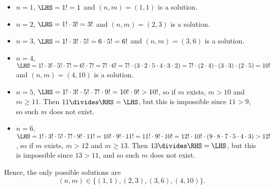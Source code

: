 \begin{enumerate}
          \begin{itemize}
              \item \(n = 1\), \(\LHS = 1! = 1\) and \((n, m) = (1, 1)\) is a solution.
              \item \(n = 2\), \(\LHS = 1! \cdot 3! = 3!\) and \((n, m) = (2, 3)\) is a solution.
              \item \(n = 3\), \(\LHS = 1! \cdot 3! \cdot 5! = 6 \cdot 5! = 6!\) and \((n, m) = (3, 6)\) is a solution.
              \item \(n = 4\), \(\LHS = 1! \cdot 3! \cdot 5! \cdot 7! = 6! \cdot 7! = 7! \cdot 6! = 7! \cdot (3 \cdot 2 \cdot 5 \cdot 4 \cdot 3 \cdot 2) = 7! \cdot (2 \cdot 4) \cdot (3 \cdot 3) \cdot (2 \cdot 5) = 10!\) and \((n, m) = (4, 10)\) is a solution.
              \item \(n = 5\), \(\LHS = 1! \cdot 3! \cdot 5! \cdot 7! \cdot 9! = 10! \cdot 9! > 10!\), so if \(m\) exists, \(m > 10\) and \(m \geq 11\). Then \(11 \divides \RHS = \LHS\), but this is impossible since \(11 > 9\), so such \(m\) does not exist.
              \item \(n = 6\), \(\LHS = 1! \cdot 3! \cdot 5! \cdot 7! \cdot 9! \cdot 11! = 10! \cdot 9! \cdot 11! = 11! \cdot 9! \cdot 10! = 12! \cdot 10! \cdot (9 \cdot 8 \cdot 7 \cdot 5 \cdot 4 \cdot 3) > 12!\), so if \(m\) exists, \(m > 12\) and \(m \geq 13\). Then \(13 \divides \RHS = \LHS\), but this is impossible since \(13 > 11\), and so such \(m\) does not exist.
          \end{itemize}

          Hence, the only possible solutions are
          \[
              (n, m) \in \{(1, 1), (2, 3), (3, 6), (4, 10)\}.
          \]
\end{enumerate}